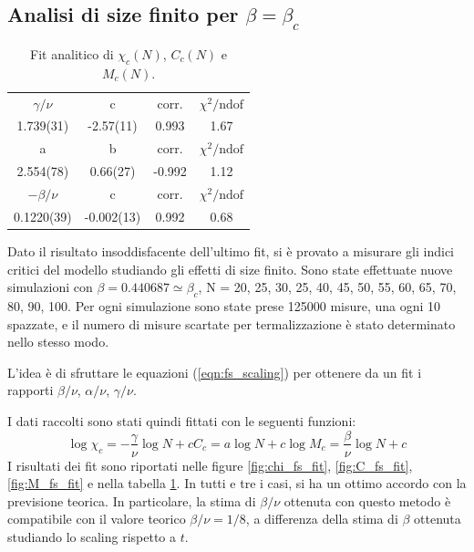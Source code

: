 \documentclass[a4paper,11pt]{article}
\newcommand{\chindof}{\chi^2 / \text{ndof}}
\begin{document}
	\subsection{Analisi di size finito per $\beta = \beta_c$}
	\begin{table}
       \centering
        \begin{tabular}{c c c c } \hline 
                $\gamma/\nu$  & c    & corr. & $\chindof$ \\ 
                1.739(31) & -2.57(11)   & 0.993   & 1.67 \\ \hline
                a  & b    & corr. & $\chindof$ \\ 
                2.554(78) & 0.66(27)   & -0.992   & 1.12 \\ \hline
                $-\beta/\nu$  & c    & corr. & $\chindof$ \\ 
                0.1220(39) & -0.002(13)   & 0.992   & 0.68 \\ \hline
        \end{tabular}
        \caption{Fit analitico di $\chi_c(N)$, $C_c(N)$ e $M_c(N)$.}
        \label{tab:fs_fit}
	\end{table}
	Dato il risultato insoddisfacente dell'ultimo fit, si è provato a misurare gli indici critici del modello studiando gli effetti di size finito. Sono state effettuate nuove simulazioni con $\beta = 0.440687 \simeq \beta_c$, N = 20, 25, 30, 25, 40, 45, 50, 55, 60, 65, 70, 80, 90, 100. Per ogni simulazione sono state prese 125000 misure, una ogni 10 spazzate, e il numero di misure scartate per termalizzazione è stato determinato nello stesso modo.
	
	L'idea è di sfruttare le equazioni (\ref{eqn:fs_scaling}) per ottenere da un fit i rapporti $\beta / \nu$, $\alpha / \nu$, $\gamma / \nu$. 

	
	I dati raccolti sono stati quindi fittati con le seguenti funzioni:
	\begin{subequations}
        \begin{equation}
            \log \chi_c = - \frac{\gamma}{\nu} \log N + c
        \end{equation}
         \begin{equation}
            C_c = a \log N + c
        \end{equation}  
        \begin{equation}
            \log M_c = \frac{\beta}{\nu} \log N + c
        \end{equation}
	\end{subequations}
	I risultati dei fit sono riportati nelle figure \ref{fig:chi_fs_fit}, \ref{fig:C_fs_fit}, \ref{fig:M_fs_fit} e nella tabella \ref{tab:fs_fit}. In tutti e tre i casi, si ha un ottimo accordo con la previsione teorica. In particolare, la stima di $\beta / \nu$ ottenuta con questo metodo è compatibile con il valore teorico $\beta / \nu = 1/8$, a differenza della stima di $\beta$ ottenuta studiando lo scaling rispetto a $t$.
	
\end{document}
